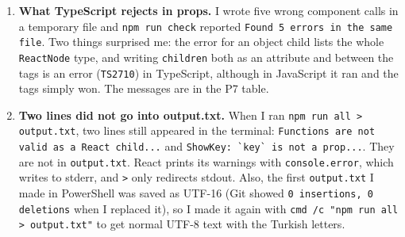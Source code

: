 \documentclass[
]{article}
\newcommand{\passthrough}[1]{#1}
\begin{document}
\begin{enumerate}
  JavaScript joined the line with the line before it and read
  \passthrough{\lstinline!let tomorrow = 'Eşkıya'[tonight, tomorrow] = [tomorrow, tonight]!},
  so it used \passthrough{\lstinline!tomorrow!} while it was still being
  created. In \passthrough{\lstinline!pitfalls.mjs!} the same mistake
  gave no error at all, only a wrong result, which I find even more
  dangerous. I put the \passthrough{\lstinline!;!} back.
\item
  \textbf{What TypeScript rejects in props.} I wrote five wrong
  component calls in a temporary file and
  \passthrough{\lstinline!npm run check!} reported
  \passthrough{\lstinline!Found 5 errors in the same file!}. Two things
  surprised me: the error for an object child lists the whole
  \passthrough{\lstinline!ReactNode!} type, and writing
  \passthrough{\lstinline!children!} both as an attribute and between
  the tags is an error (\passthrough{\lstinline!TS2710!}) in TypeScript,
  although in JavaScript it ran and the tags simply won. The messages
  are in the P7 table.
\item
  \textbf{Two lines did not go into output.txt.} When I ran
  \passthrough{\lstinline!npm run all > output.txt!}, two lines still
  appeared in the terminal:
  \passthrough{\lstinline!Functions are not valid as a React child...!}
  and \passthrough{\lstinline!ShowKey: `key` is not a prop...!}. They
  are not in \passthrough{\lstinline!output.txt!}. React prints its
  warnings with \passthrough{\lstinline!console.error!}, which writes to
  stderr, and \passthrough{\lstinline!>!} only redirects stdout. Also,
  the first \passthrough{\lstinline!output.txt!} I made in PowerShell
  was saved as UTF-16 (Git showed
  \passthrough{\lstinline!0 insertions, 0 deletions!} when I replaced
  it), so I made it again with
  \passthrough{\lstinline!cmd /c "npm run all > output.txt"!} to get
  normal UTF-8 text with the Turkish letters.
\end{enumerate}
\end{document}
